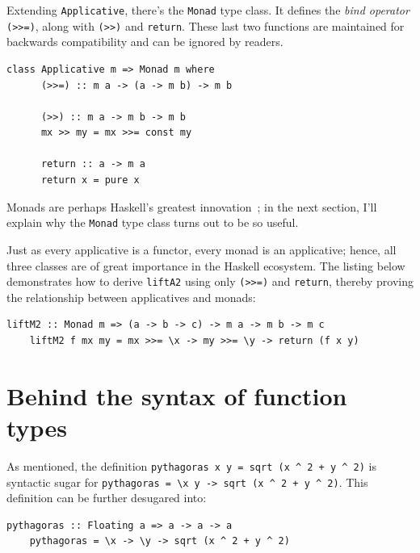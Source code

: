 \documentclass[UdineBachThesis,american,11pt]{PhdThesis}
\begin{document}
  Extending \mbox{\texttt{Applicative}}, there's the \mbox{\texttt{Monad}} type
  class. It defines the \emph{bind operator} \mbox{\texttt{(>>=)}}, along with
  \mbox{\texttt{(>>)}} and \mbox{\texttt{return}}. These last two functions are
  maintained for backwards compatibility and can be ignored by readers.

  \begin{Verbatim}[gobble=4,fontsize=\small]
    class Applicative m => Monad m where
      (>>=) :: m a -> (a -> m b) -> m b

      (>>) :: m a -> m b -> m b
      mx >> my = mx >>= const my

      return :: a -> m a
      return x = pure x
  \end{Verbatim}

  Monads are perhaps Haskell's greatest
  innovation~\cite{monads-for-functional-programming}; in the next section, I'll
  explain why the \mbox{\texttt{Monad}} type class turns out to be so useful.

  Just as every applicative is a functor, every monad is an applicative; hence,
  all three classes are of great importance in the Haskell ecosystem. The
  listing below demonstrates how to derive \mbox{\texttt{liftA2}} using only
  \mbox{\texttt{(>>=)}} and \mbox{\texttt{return}}, thereby proving the
  relationship between applicatives and monads:

  \begin{Verbatim}[gobble=4,fontsize=\small]
    liftM2 :: Monad m => (a -> b -> c) -> m a -> m b -> m c
    liftM2 f mx my = mx >>= \x -> my >>= \y -> return (f x y)
  \end{Verbatim}

  \newpage

  \section{Behind the syntax of function types}

  As mentioned, the definition
  \mbox{\texttt{pythagoras x y = sqrt (x {\textasciicircum} 2 + y {\textasciicircum} 2)}}
  is syntactic sugar for
  \mbox{\texttt{pythagoras = \textbackslash x y -> sqrt (x {\textasciicircum} 2 + y {\textasciicircum} 2)}}.
  This definition can be further desugared into:

  \begin{Verbatim}[gobble=4,fontsize=\small]
    pythagoras :: Floating a => a -> a -> a
    pythagoras = \x -> \y -> sqrt (x ^ 2 + y ^ 2)
  \end{Verbatim}
\end{document}
